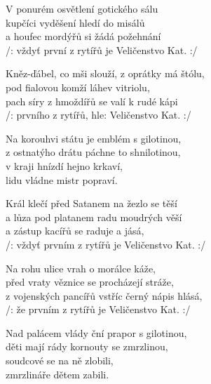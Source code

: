 \pagestyle{empty}

\vspace{-2pt}
\ve{}
V ponurém osvětlení gotického sálu\\
kupčíci vyděšení hledí do misálů\\
a houfec mordýřů si žádá požehnání \\
/: vždyť první z rytířů je Veličenstvo Kat. :/ 

\vspace{-2pt}
\ve{}
Kněz-ďábel, co mši slouží, z oprátky má štólu,\\
pod fialovou komží láhev vitriolu,\\
pach síry z hmoždířů se valí k rudé kápi\\
/: prvního z rytířů, hle: Veličenstvo Kat. :/

\vspace{-2pt}
\cho{}
Na korouhvi státu je emblém s gilotinou,\\
z ostnatýho drátu páchne to shnilotinou,\\
v kraji hnízdí hejno krkaví,\\
lidu vládne mistr popraví.

\vspace{-2pt}
\ve{}
Král klečí před Satanem na žezlo se těší\\
a lůza pod platanem radu moudrých věší\\
a zástup kacířů se raduje a jásá,\\
/: vždyť prvním z rytířů je Veličenstvo Kat. :/

\vspace{-2pt}
\ve{}
Na rohu ulice vrah o morálce káže,\\
před vraty věznice se procházejí stráže,\\
z vojenských pancířů vstříc černý nápis hlásá,\\
/: že prvním z rytířů je Veličenstvo Kat. :/

\vspace{-2pt}
\cho{}
Nad palácem vlády ční prapor s gilotinou,\\
děti mají rády kornouty se zmrzlinou,\\
soudcové se na ně zlobili,\\
zmrzlináře dětem zabili.

